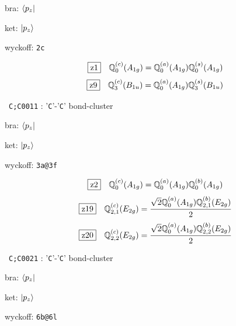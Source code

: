 \documentclass[fleqn,10pt,landscape]{jsarticle}
\begin{document}
\noindent\quad * bra: $\bra{p_{z}}$

\noindent\quad * ket: $\ket{p_{z}}$

\noindent\quad * wyckoff: \texttt{2c}

\begin{dmath*}
\hspace*{3mm}\fbox{z1}\quad \mathbb{Q}_{0}^{(c)}(A_{1g})=\mathbb{Q}_{0}^{(a)}(A_{1g}) \mathbb{Q}_{0}^{(s)}(A_{1g})
\end{dmath*}
\begin{dmath*}
\hspace*{3mm}\fbox{z9}\quad \mathbb{Q}_{3}^{(c)}(B_{1u})=\mathbb{Q}_{0}^{(a)}(A_{1g}) \mathbb{Q}_{3}^{(s)}(B_{1u})
\end{dmath*}
\vspace{5mm}

\noindent\textbullet\, \texttt{C;C\texttt{}001\texttt{}1} : '\texttt{C}'-'\texttt{C}' bond-cluster

\noindent\quad * bra: $\bra{p_{z}}$

\noindent\quad * ket: $\ket{p_{z}}$

\noindent\quad * wyckoff: \texttt{3a@3f}

\begin{dmath*}
\hspace*{3mm}\fbox{z2}\quad \mathbb{Q}_{0}^{(c)}(A_{1g})=\mathbb{Q}_{0}^{(a)}(A_{1g}) \mathbb{Q}_{0}^{(b)}(A_{1g})
\end{dmath*}
\begin{dmath*}
\hspace*{3mm}\fbox{z19}\quad \mathbb{Q}_{2,1}^{(c)}(E_{2g})=\frac{\sqrt{2} \mathbb{Q}_{0}^{(a)}(A_{1g}) \mathbb{Q}_{2,1}^{(b)}(E_{2g})}{2}
\end{dmath*}
\begin{dmath*}
\hspace*{3mm}\fbox{z20}\quad \mathbb{Q}_{2,2}^{(c)}(E_{2g})=\frac{\sqrt{2} \mathbb{Q}_{0}^{(a)}(A_{1g}) \mathbb{Q}_{2,2}^{(b)}(E_{2g})}{2}
\end{dmath*}
\vspace{5mm}

\noindent\textbullet\, \texttt{C;C\texttt{}002\texttt{}1} : '\texttt{C}'-'\texttt{C}' bond-cluster

\noindent\quad * bra: $\bra{p_{z}}$

\noindent\quad * ket: $\ket{p_{z}}$

\noindent\quad * wyckoff: \texttt{6b@6l}
\end{document}
